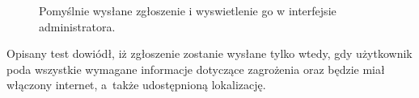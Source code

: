 \setlength{\fboxrule}{0.5pt}
\begin{figure}[H]
    \centering
    \caption{Pomyślnie wysłane zgłoszenie i wyswietlenie go w interfejsie administratora.}
    \label{test:zglos5}
\end{figure}
Opisany test dowiódł, iż zgłoszenie zostanie wysłane tylko wtedy, gdy użytkownik poda wszystkie wymagane informacje dotyczące zagrożenia oraz będzie miał włączony internet, a~także udostępnioną lokalizację.
